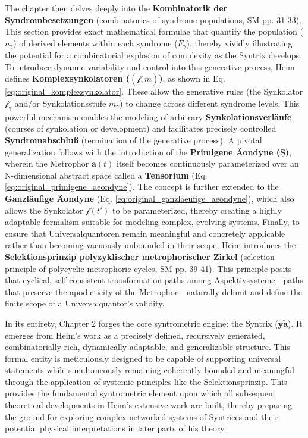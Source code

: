 \documentclass[12pt]{article}
\newcommand{\syntrix}{\bm{y\widetilde{a}}}
\newcommand{\metrophor}{\bm{\widetilde{a}}}
\newcommand{\synkolator}{\mathcal{f}}
\newcommand{\synkolationsstufe}{m}
\newcommand{\syndrom}{F}
\begin{document}
The chapter then delves deeply into the \textbf{Kombinatorik der Syndrombesetzungen} (combinatorics of syndrome populations, SM pp. 31-33). This section provides exact mathematical formulae that quantify the population (\( n_\gamma \)) of derived elements within each syndrome (\(\syndrom_\gamma\)), thereby vividly illustrating the potential for a combinatorial explosion of complexity as the Syntrix develops. To introduce dynamic variability and control into this generative process, Heim defines \textbf{Komplexsynkolatoren (\( (\underline{\synkolator}, \underline{\synkolationsstufe}) \))}, as shown in Eq. \eqref{eq:original_komplexsynkolator}. These allow the generative rules (the Synkolator \( \synkolator_\gamma \) and/or Synkolationsstufe \( \synkolationsstufe_\gamma \)) to change across different syndrome levels. This powerful mechanism enables the modeling of arbitrary \textbf{Synkolationsverläufe} (courses of synkolation or development) and facilitates precisely controlled \textbf{Syndromabschluß} (termination of the generative process). A pivotal generalization follows with the introduction of the \textbf{Primigene \"{A}ondyne (\(\underline{\bm{S}}\))}, wherein the Metrophor \( \metrophor(t) \) itself becomes continuously parameterized over an N-dimensional abstract space called a \textbf{Tensorium} (Eq. \eqref{eq:original_primigene_aeondyne}). The concept is further extended to the \textbf{Ganzläufige \"{A}ondyne} (Eq. \eqref{eq:original_ganzlaeufige_aeondyne}), which also allows the Synkolator \( \synkolator(t') \) to be parameterized, thereby creating a highly adaptable formalism suitable for modeling complex, evolving systems. Finally, to ensure that Universalquantoren remain meaningful and concretely applicable rather than becoming vacuously unbounded in their scope, Heim introduces the \textbf{Selektionsprinzip polyzyklischer metrophorischer Zirkel} (selection principle of polycyclic metrophoric cycles, SM pp. 39-41). This principle posits that cyclical, self-consistent transformation paths among Aspektivsysteme—paths that preserve the apodicticity of the Metrophor—naturally delimit and define the finite scope of a Universalquantor's validity.

In its entirety, Chapter 2 forges the core syntrometric engine: the Syntrix (\(\syntrix\)). It emerges from Heim's work as a precisely defined, recursively generated, combinatorially rich, dynamically adaptable, and generalizable structure. This formal entity is meticulously designed to be capable of supporting universal statements while simultaneously remaining coherently bounded and meaningful through the application of systemic principles like the Selektionsprinzip. This provides the fundamental syntrometric element upon which all subsequent theoretical developments in Heim's extensive work are built, thereby preparing the ground for exploring complex networked systems of Syntrices and their potential physical interpretations in later parts of his theory.
\end{document}
